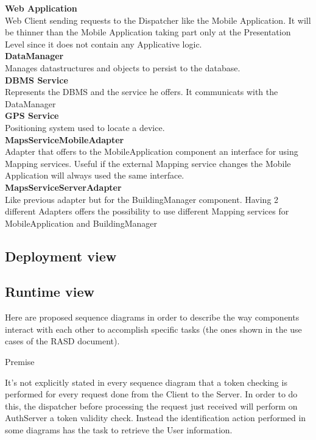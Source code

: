 \textbf{Web Application}\\
Web Client sending requests to the Dispatcher like the Mobile Application. It will be thinner than the Mobile Application taking part only at the Presentation Level since it does not contain any Applicative logic.\\

\textbf{DataManager}\\
Manages datastructures and objects to persist to the database.\\

\textbf{DBMS Service}\\
Represents the DBMS and the service he offers. It communicats with the DataManager\\

\textbf{GPS Service}\\
Positioning system used to locate a device.\\

\textbf{MapsServiceMobileAdapter}\\
Adapter that offers to the MobileApplication component an interface for using Mapping services. Useful if the external Mapping service changes the Mobile Application will always used the same interface.\\

\textbf{MapsServiceServerAdapter}\\
Like previous adapter but for the BuildingManager component. Having 2 different Adapters offers the possibility to use different Mapping services for MobileApplication and BuildingManager 


\subsection{Deployment view}

\subsection{Runtime view}
Here are proposed sequence diagrams in order to describe the way components interact with each other to accomplish specific tasks (the ones shown in the use cases of the RASD document).\\

\begin{center} 
Premise\\
\end{center}
It’s not explicitly stated in every sequence diagram that a token checking is performed for every request done from the Client to the Server. In order to do this, the dispatcher before processing the request just received will perform on AuthServer a token validity check. Instead the identification action performed in some diagrams has the task to retrieve the User information.\\

